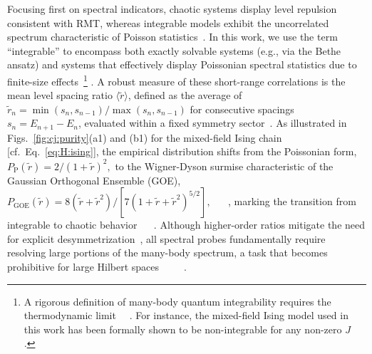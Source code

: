 \documentclass[pra,twocolumn,aps,showpacs,superscriptaddress,longbibliography]{revtex4-2}%
\providecommand{\DIFadd}[1]{{\protect\color{blue} \sf #1}} %
\providecommand{\DIFdel}[1]{{\protect\color{red} \scriptsize #1}} %
\providecommand{\DIFaddbegin}{} %
\providecommand{\DIFaddend}{} %
\providecommand{\DIFdelbegin}{} %
\providecommand{\DIFdelend}{} %
\begin{document}
Focusing first on spectral indicators, chaotic systems display level repulsion consistent with RMT, whereas integrable models exhibit the uncorrelated spectrum characteristic of Poisson statistics~\cite{berry_1977_level}. \DIFaddbegin \DIFadd{In this work, we use the term ``integrable'' to encompass both exactly solvable systems (e.g., via the Bethe ansatz) and systems that effectively display Poissonian spectral statistics due to finite-size effects~}\protect\footnote{\DIFadd{A rigorous definition of many-body quantum integrability requires the thermodynamic limit~\mbox{%
\cite{caux_2011_remarks}}\hskip0pt%
. For instance, the mixed-field Ising model used in this work has been formally shown to be non-integrable for any non-zero $J$~\mbox{%
\cite{chiba_2024_proof}}\hskip0pt%
.}}\DIFadd{. }\DIFaddend A robust measure of these short-range correlations is the mean level spacing ratio $\langle \tilde{r} \rangle$, defined as the average of $\tilde{r}_n = \min(s_n, s_{n-1})/\max(s_n, s_{n-1})$ for consecutive spacings $s_n = E_{n+1} - E_n$, evaluated within a fixed symmetry sector~\cite{oganesyan_2007_localization}. As illustrated in Figs.~\ref{fig:cj:purity}(a1) and (b1) for the mixed-field Ising chain [cf.~Eq.~\eqref{eq:H:ising}], the empirical distribution shifts from the Poissonian form,
\(
P_{\text{P}}(\tilde{r}) = 2/(1+\tilde{r})^2,
\)
to the Wigner-Dyson surmise characteristic of the Gaussian Orthogonal Ensemble (GOE),
\(
P_{\text{GOE}}(\tilde{r}) = 8(\tilde{r} + \tilde{r}^2) / [7(1+\tilde{r}+\tilde{r}^2)^{5/2}],
\)\DIFaddbegin \DIFadd{~\mbox{%
\cite{atas_2013_distribution}}\hskip0pt%
, }\DIFaddend marking the transition from integrable to chaotic behavior\DIFdelbegin \DIFdel{~\mbox{%
\cite{atas_2013_distribution}}\hskip0pt%
}\DIFdelend . Although higher-order ratios mitigate the need for explicit desymmetrization~\cite{tekur_2020_symmetry}, all spectral probes fundamentally require resolving large portions of the many-body spectrum, a task that becomes prohibitive for large Hilbert spaces~\DIFdelbegin \DIFdel{\mbox{%
\cite{scialchi_2024_integrabilitytochaos, bernien2017probing, huang2020predicting, brydges2019probing}}\hskip0pt%
}\DIFdelend \DIFaddbegin \DIFadd{\mbox{%
\cite{scialchi_2024_integrabilitytochaos, bernien2017probing, huang_2020_predicting, brydges2019probing}}\hskip0pt%
}\DIFaddend .
\end{document}

